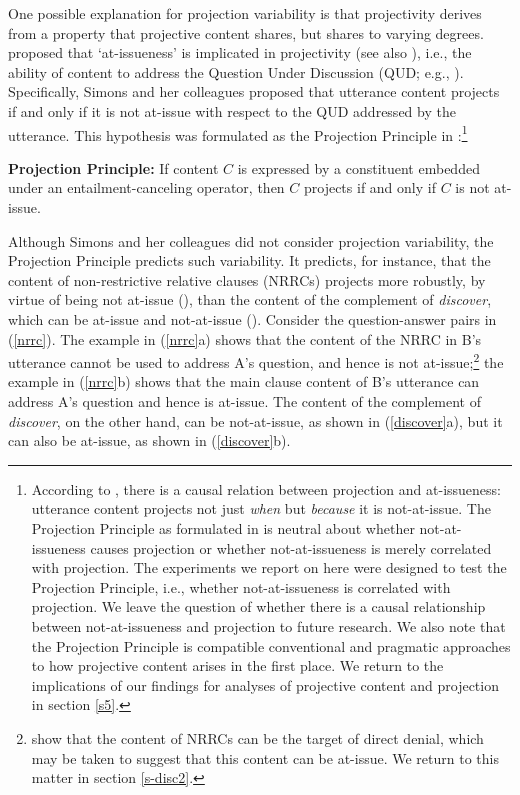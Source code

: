 \documentclass[11pt,fleqn]{article}
\newcommand{\6}{\mbox{$[\hspace*{-.6mm}[$}}
\newcommand{\9}{\mbox{$]\hspace*{-.6mm}]$}}
\begin{document}
One possible explanation for projection variability is that projectivity derives from a property that projective content shares, but shares to varying degrees. \citet{brst-salt10} proposed that `at-issueness' is implicated in projectivity (see also \citealt{abrusan2011}), i.e., the ability of content to address the Question Under Discussion (QUD; e.g., \citealt{roberts12}).  Specifically, Simons and her colleagues proposed that utterance content projects if and only if it is not at-issue with respect to the QUD addressed by the utterance. This hypothesis was formulated as the Projection Principle in \citealt[280]{brst-ar}:\footnote{According to \citealt[315]{brst-salt10}, there is a causal relation between projection and at-issueness: utterance content projects not just {\em when} but {\em because} it is not-at-issue. The Projection Principle as formulated in \citealt{brst-ar} is neutral about whether not-at-issueness causes projection or whether not-at-issueness is merely correlated with projection. The experiments we report on here were designed to test the Projection Principle, i.e., whether not-at-issueness is correlated with projection. We leave the question of whether there is a causal relationship between not-at-issueness and projection to future research. We also note that the Projection Principle is compatible conventional and pragmatic approaches to how projective content arises in the first place. We return to the implications of our findings for analyses of projective content and projection in section \ref{s5}.}

\begin{exe}
\ex\label{pp} {\bf Projection Principle:} If content $C$ is expressed by a constituent embedded under an entailment-canceling operator, then $C$ projects if and only if $C$ is not at-issue.

\end{exe} 
Although Simons and her colleagues did not consider projection variability, the Projection Principle predicts such variability. It predicts, for instance, that the content of non-restrictive relative clauses (NRRCs) projects more robustly, by virtue of being not at-issue (\citealt{potts05}), than the content of the complement of {\em discover}, which can be at-issue and not-at-issue (\citealt{simons07}). Consider the question-answer pairs in (\ref{nrrc}). The example in (\ref{nrrc}a) shows that the content of the NRRC in B's utterance cannot be used to address A's question, and hence is not at-issue;\footnote{\citet{syrett-koev2015} show that the content of NRRCs can be the target of direct denial, which may be taken to suggest that this content can be at-issue. We return to this matter in section \ref{s-disc2}.}  the example in (\ref{nrrc}b) shows that the main clause content of B's utterance can address A's question and hence is at-issue. The content of the complement of {\em discover}, on the other hand, can be not-at-issue, as shown in (\ref{discover}a), but it can also be at-issue, as shown in (\ref{discover}b). 
\end{document}
